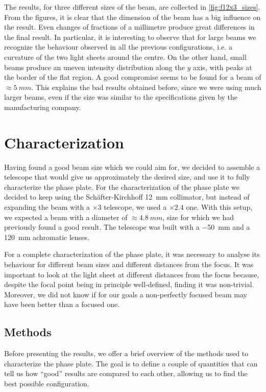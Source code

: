 The results, for three different sizes of the beam, are collected in \cref{fig:f12x3_sizes}. From the figures, it is clear that the dimension of the beam has a big influence on the result. Even changes of fractions of a millimetre produce great differences in the final result. In particular, it is interesting to observe that for large beams we recognize the behaviour observed in all the previous configurations, i.e. a curvature of the two light sheets around the centre. On the other hand, small beams produce an uneven intensity distribution along the $y$ axis, with peaks at the border of the flat region. A good compromise seems to be found for a beam of $\approx \SI{5}{mm}$. This explains the bad results obtained before, since we were using much larger beams, even if the size was similar to the specifications given by the manufacturing company.

\section{Characterization}
\label{sec:characterization}
Having found a good beam size which we could aim for, we decided to assemble a telescope that would give us approximately the desired size, and use it to fully characterize the phase plate. For the characterization of the phase plate we decided to keep using the Schäfter-Kirchhoff \SI{12}{mm} collimator, but instead of expanding the beam with a $\times3$ telescope, we used a $\times2.4$ one. With this setup, we expected a beam with a diameter of $\approx \SI{4.8}{mm}$, size for which we had previously found a good result. The telescope was built with a \SI{-50}{mm} and a \SI{120}{mm} achromatic lenses.

For a complete characterization of the phase plate, it was necessary to analyse its behaviour for different beam sizes and different distances from the focus. It was important to look at the light sheet at different distances from the focus because, despite the focal point being in principle well-defined, finding it was non-trivial. Moreover, we did not know if for our goals a non-perfectly focused beam may have been better than a focused one.

\subsection{Methods}
\label{sec:characterization_methods}
Before presenting the results, we offer a brief overview of the methods used to characterize the phase plate. The goal is to define a couple of quantities that can tell us how \enquote{good} results are compared to each other, allowing us to find the best possible configuration.


